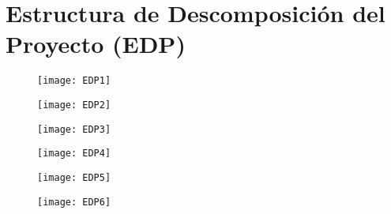 
\chapter[EDP]{Estructura de Descomposición del Proyecto (EDP)}\label{edp}

\vspace{2cm}
\begin{figure}[h]
\centering\texttt{[image: EDP1]}\\
  \label{fg:EDP1}
\end{figure}

\begin{figure}[h]
  \centering\texttt{[image: EDP2]}\\
  \label{fg:EDP2}
\end{figure}

\begin{figure}[h]
  \centering\texttt{[image: EDP3]}\\
  \label{fg:EDP3}
\end{figure}

\begin{figure}[h]
  \centering\texttt{[image: EDP4]}\\
  \label{fg:EDP4}
\end{figure}

\begin{figure}[h]
  \centering\texttt{[image: EDP5]}\\
  \label{fg:EDP5}
\end{figure}

\begin{figure}[h]
  \centering\texttt{[image: EDP6]}\\
\end{figure}